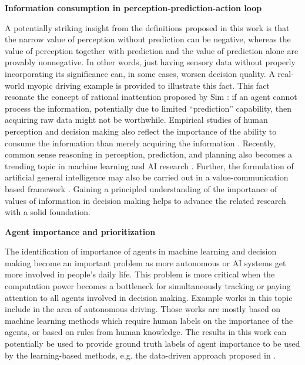 \documentclass{article}
\begin{document}
\noindent\textbf{Information consumption in perception-prediction-action loop}

A potentially striking insight from the definitions proposed in this work is that the narrow value of perception without prediction can be negative, whereas the value of perception together with prediction and the value of prediction alone are provably nonnegative. In other words, just having sensory data without properly incorporating its significance can, in some cases, worsen decision quality. A real-world myopic driving example is provided to illustrate this fact. 
This fact resonate the concept of rational inattention proposed by Sim \cite{sims2003implications, sims2006rational}: if an agent cannot process the information, potentially due to limited ``prediction'' capability, then acquiring raw data might not be worthwhile.
Empirical studies of human perception and decision making also reflect the importance of the ability to consume the information than merely acquiring the information \cite{BREHMER1992211, MALONEY20102362, Herd21, Morelli22, voi_human_ai}.
Recently, common sense reasoning in perception, prediction, and planning also becomes a trending topic in machine learning and AI research \cite{common_sense_cvpr23, AIAlignment}. Further, the formulation of artificial general intelligence may also be carried out in a value-communication based framework \cite{CUV2025}.  Gaining a principled understanding of the importance of values of information in decision making helps to advance the related research with a solid foundation.

\noindent\textbf{Agent importance and prioritization}

The identification of importance of agents in machine learning and decision making become an important problem as more autonomous or AI systems get more involved in people's daily life. 
This problem is more critical when the computation power becomes a bottleneck for simultaneously tracking or paying attention to all agents involved in decision making.
Example works in this topic include \cite{agent_priority19,goal_important19,Zhang2020InteractionGF,important_semi22} in the area of autonomous driving. 
Those works are mostly based on machine learning methods which require human labels on the importance of the agents, or based on rules from human knowledge. The results in this work can potentially be used to provide ground truth labels of agent importance to be used by the learning-based methods, e.g. the data-driven approach proposed in \cite{rank2tell}.
\end{document}
